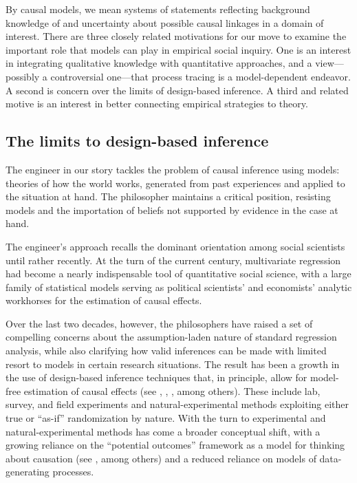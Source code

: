 \documentclass[12pt,]{book}
\begin{document}
By causal models, we mean systems of statements reflecting background knowledge of and uncertainty about possible causal linkages in a domain of interest. There are three closely related motivations for our move to examine the important role that models can play in empirical social inquiry. One is an interest in integrating qualitative knowledge with quantitative approaches, and a view---possibly a controversial one---that process tracing is a model-dependent endeavor. A second is concern over the limits of design-based inference. A third and related motive is an interest in better connecting empirical strategies to theory.

\hypertarget{the-limits-to-design-based-inference}{%
\subsection{The limits to design-based inference}\label{the-limits-to-design-based-inference}}

The engineer in our story tackles the problem of causal inference using models: theories of how the world works, generated from past experiences and applied to the situation at hand. The philosopher maintains a critical position, resisting models and the importation of beliefs not supported by evidence in the case at hand.

The engineer's approach recalls the dominant orientation among social scientists until rather recently. At the turn of the current century, multivariate regression had become a nearly indispensable tool of quantitative social science, with a large family of statistical models serving as political scientists' and economists' analytic workhorses for the estimation of causal effects.

Over the last two decades, however, the philosophers have raised a set of compelling concerns about the assumption-laden nature of standard regression analysis, while also clarifying how valid inferences can be made with limited resort to models in certain research situations. The result has been a growth in the use of design-based inference techniques that, in principle, allow for model-free estimation of causal effects (see \citet{dunning2012natural}, \citet{GerGreKap04}, \citet{druckman2011experimentation}, \citet{palfrey2009laboratory} among others). These include lab, survey, and field experiments and natural-experimental methods exploiting either true or ``as-if'' randomization by nature. With the turn to experimental and natural-experimental methods has come a broader conceptual shift, with a growing reliance on the ``potential outcomes'' framework as a model for thinking about causation (see \citet{Rubin1974}, \citet{splawa1990application} among others) and a reduced reliance on models of data-generating processes.
\end{document}
